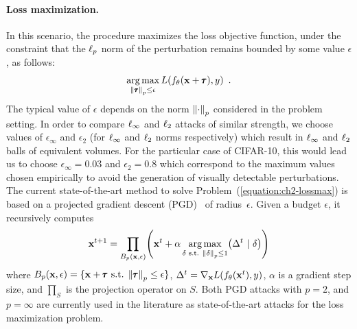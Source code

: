 \paragraph{Loss maximization.}
In this scenario, the procedure maximizes the loss objective function, under the constraint that the $\ell_p $ norm of the perturbation remains bounded by some value $\epsilon$, as follows:  
\begin{equation}
  \operatorname*{arg\,max}_{\norm{\pmb{\tau}}_p \leq \epsilon} L(f_\theta(\mathbf{x} + \pmb{\tau}), y) \enspace.
  \label{equation:ch2-lossmax}
\end{equation}
The typical value of $\epsilon$ depends on the norm $\norm{\cdot}_p$ considered in the problem setting.
In order to compare $\ell_\infty $ and $\ell_2 $ attacks of similar strength, we choose values of $\epsilon_\infty$ and $\epsilon_2$ (for $\ell_\infty $ and $\ell_2 $ norms respectively) which result in $\ell_\infty $ and $\ell_2 $ balls of equivalent volumes.
For the particular case of CIFAR-10, this would lead us to choose $\epsilon_\infty = 0.03$ and $\epsilon_2 = 0.8$ which correspond to the maximum values chosen empirically to avoid the generation of visually detectable perturbations. 
The current state-of-the-art method to solve Problem~(\ref{equation:ch2-lossmax}) is based on a projected gradient descent (PGD)~\cite{madry2018towards} of radius~$\epsilon$. Given a budget $\epsilon$, it recursively computes
\begin{equation}
  \xvec^{t+1}=\prod_{B_p(\xvec,\epsilon)}\left(\xvec^t
  +\alpha \argmax_{\delta \text{ s.t. } \norm{\delta}_p \leq 1} \left( \Delta^t \ |\ \delta \right)\right)
  \label{equation:ch2-projectionPGD}
\end{equation}
where $B_p(\mathbf{x},\epsilon) = \{ \mathbf{x} + \pmb{\tau} \text{ s.t. } \norm{\pmb{\tau}}_p \leq \epsilon\}$, $\Delta^t = \nabla_\xvec L\left( f_\theta \left(\xvec^t \right), y \right)$, $\alpha$ is a gradient step size, and $\prod_S$ is the projection operator on $S$. Both PGD attacks with $p=2$, and $p=\infty$ are currently used in the literature as state-of-the-art attacks for the loss maximization problem. 

